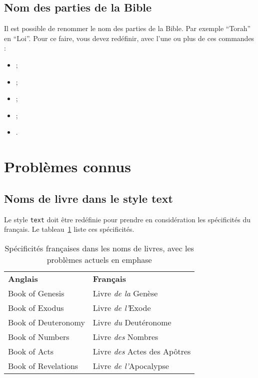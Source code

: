 \documentclass{ltxdoc}
\begin{document}
\subsection{Nom des parties de la Bible}
Il est possible de renommer le nom des parties de la Bible. Par exemple \enquote{Torah} en \enquote{Loi}.
Pour ce faire, vous devez redéfinir, avec   l'une ou plus de ces commandes :
 \begin{itemize}
 \item {} ;
 \item {} ;
 \item {} ;
 \item {};
 \item {}.
\end{itemize}
\section{Problèmes connus}

\subsection{Noms de livre dans le style  \textsf{text}}

Le style \verb|text| doit être redéfinie pour prendre en considération les spécificités du français. Le tableau~\ref{tab:textspec} liste ces spécificités.

\begin{table}[tbh]
\caption{Spécificités françaises dans les noms de livres, avec les problèmes actuels en emphase} 
\label{tab:textspec}
\vspace{10pt}
\begin{center}
\begin{tabular}{lp{}}
\bfseries Anglais & \bfseries Français\\
Book of Genesis & Livre \emph{de la} Gen\`ese\\
Book of Exodus & Livre \emph{de l'}Exode\\
Book of Deuteronomy & Livre \emph{du} Deut\'eronome\\
Book of Numbers & Livre \emph{des} Nombres\\
Book of Acts & Livre \emph{des} Actes des Ap\^otres\\
Book of Revelations & Livre \emph{de l'}Apocalypse\\
\end{tabular}
\end{center}
\end{table}
\end{document}
